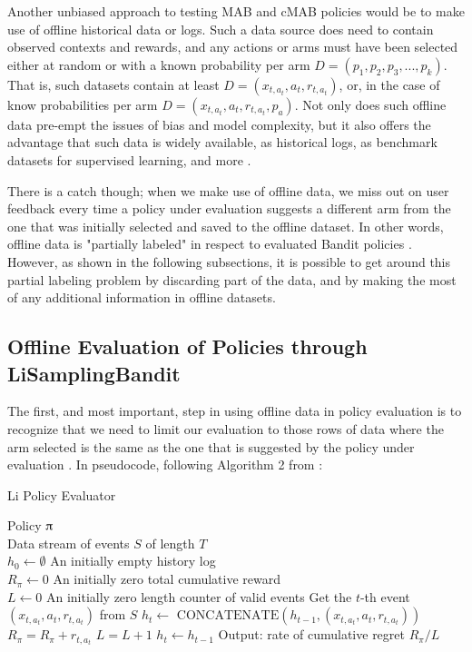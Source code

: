 \documentclass{jss}\usepackage[]{graphicx}\usepackage[]{color}
\begin{document}
Another unbiased approach to testing MAB and cMAB policies would be to make use of offline historical data or logs. Such a data source does need to contain observed contexts and rewards, and any actions or arms must have been selected either at random or with a known probability per arm \( D = (p_1,p_2,p_3,...,p_k) \). That is, such datasets contain at least \( D = (x_{t,a_t},a_{t},r_{t,a_t}) \), or, in the case of know probabilities per arm \( D = (x_{t,a_t},a_{t},r_{t,a_t},p_a) \). Not only does such offline data pre-empt the issues of bias and model complexity, but it also offers the advantage that such data is widely available, as historical logs, as benchmark datasets for supervised learning, and more \citep{Li2011}.

There is a catch though; when we make use of offline data, we miss out on user feedback every time a policy under evaluation suggests a different arm from the one that was initially selected and saved to the offline dataset. In other words, offline data is "partially labeled" in respect to evaluated Bandit policies \citep{Strehl2010}. However, as shown in the following subsections, it is possible to get around this partial labeling problem by discarding part of the data, and by making the most of any additional information in offline datasets.

\subsection{Offline Evaluation of Policies through LiSamplingBandit}

The first, and most important, step in using offline data in policy evaluation is to recognize that we need to limit our evaluation to those rows of data where the arm selected is the same as the one that is suggested by the policy under evaluation \citep{Li2012,Li2011}. In pseudocode, following Algorithm 2 from \citep{Li2011}:

\begin{algorithm}[H]
\caption{Li Policy Evaluator}
\label{Alg:LiBandit}
\begin{algorithmic}
\REQUIRE  Policy $\piup$ \\
                 Data stream of events $S$ of length $T$  \\
                 $h_0 \leftarrow \emptyset$ {An initially empty history log}\\
                 $R_\pi \leftarrow 0$ {An initially zero total cumulative reward}\\
                 $L \leftarrow 0$ {An initially zero length counter of valid events}
	\STATE Get the $t$-th event \( (x_{t,a_t},a_{t},r_{t,a_t}) \) from  $S$
	       \STATE $h_{t} \leftarrow $  \(\textrm{CONCATENATE}\left( h_{t-1},(x_{t,a_t},a_{t},r_{t,a_t})  \right)\)
	       \STATE $R_\pi = R_\pi + r_{t,a_t}$
	       \STATE $L = L + 1$
	\ELSE
	        \STATE $h_{t} \leftarrow  h_{t-1} $
	\ENDIF
\ENDFOR
\STATE Output: rate of cumulative regret $R_\pi / L $
\end{algorithmic}
\end{algorithm}
\end{document}
